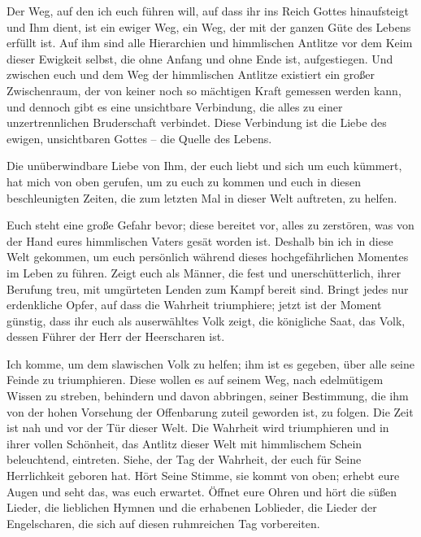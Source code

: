 Der Weg, auf den ich euch führen will, auf dass ihr ins Reich Gottes hinaufsteigt und Ihm dient, ist ein ewiger Weg, ein Weg, der mit der ganzen Güte des Lebens erfüllt ist. Auf ihm sind alle Hierarchien und himmlischen Antlitze vor dem Keim dieser Ewigkeit selbst, die ohne Anfang und ohne Ende ist, aufgestiegen. Und zwischen euch und dem Weg der himmlischen Antlitze existiert ein großer Zwischenraum, der von keiner noch so mächtigen Kraft gemessen werden kann, und dennoch gibt es eine unsichtbare Verbindung, die alles zu einer unzertrennlichen Bruderschaft verbindet. Diese Verbindung ist die Liebe des ewigen, unsichtbaren Gottes -- die Quelle des Lebens. 

Die unüberwindbare Liebe von Ihm, der euch liebt und sich um euch kümmert, hat mich von oben gerufen, um zu euch zu kommen und euch in diesen beschleunigten Zeiten, die zum letzten Mal in dieser Welt auftreten, zu helfen. 

Euch steht eine große Gefahr bevor; diese bereitet vor, alles zu zerstören, was von der Hand eures himmlischen Vaters gesät worden ist. Deshalb bin ich in diese Welt gekommen, um euch persönlich während dieses hochgefährlichen Momentes im Leben zu führen. Zeigt euch als Männer, die fest und unerschütterlich, ihrer Berufung treu, mit umgürteten Lenden zum Kampf bereit sind. Bringt jedes nur erdenkliche Opfer, auf dass die Wahrheit triumphiere; jetzt ist der Moment günstig, dass ihr euch als auserwähltes Volk zeigt, die königliche Saat, das Volk, dessen Führer der Herr der Heerscharen ist.

Ich komme, um dem slawischen Volk zu helfen; ihm ist es gegeben, über alle seine Feinde zu triumphieren. Diese wollen es auf seinem Weg, nach edelmütigem Wissen zu streben, behindern und davon abbringen, seiner Bestimmung, die ihm von der hohen Vorsehung der Offenbarung zuteil geworden ist, zu folgen. Die Zeit ist nah und vor der Tür dieser Welt. Die Wahrheit wird triumphieren und in ihrer vollen Schönheit, das Antlitz dieser Welt mit himmlischem Schein beleuchtend, eintreten. Siehe, der Tag der Wahrheit, der euch für Seine Herrlichkeit geboren hat. Hört Seine Stimme, sie kommt von oben; erhebt eure Augen und seht das, was euch erwartet. Öffnet eure Ohren und hört die süßen Lieder, die lieblichen Hymnen und die erhabenen Loblieder, die Lieder der Engelscharen, die sich auf diesen ruhmreichen Tag vorbereiten. 

